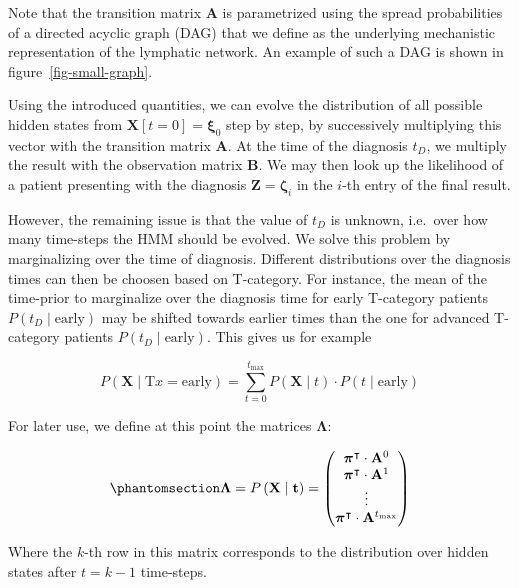 \documentclass[
  sn-mathphys-num,
]{sn-jnl}
\begin{document}
Note that the transition matrix \(\mathbf{A}\) is parametrized using the
spread probabilities of a directed acyclic graph (DAG) that we define as
the underlying mechanistic representation of the lymphatic network. An
example of such a DAG is shown in figure~\ref{fig-small-graph}.

Using the introduced quantities, we can evolve the distribution of all
possible hidden states from \(\mathbf{X}[t=0] = \boldsymbol{\xi}_0\)
step by step, by successively multiplying this vector with the
transition matrix \(\mathbf{A}\). At the time of the diagnosis \(t_D\),
we multiply the result with the observation matrix \(\mathbf{B}\). We
may then look up the likelihood of a patient presenting with the
diagnosis \(\mathbf{Z}=\boldsymbol{\zeta}_i\) in the \(i\)-th entry of
the final result.

However, the remaining issue is that the value of \(t_D\) is unknown,
i.e.~over how many time-steps the HMM should be evolved. We solve this
problem by marginalizing over the time of diagnosis. Different
distributions over the diagnosis times can then be choosen based on
T-category. For instance, the mean of the time-prior to marginalize over
the diagnosis time for early T-category patients
\(P\left( t_D \mid \text{early} \right)\) may be shifted towards earlier
times than the one for advanced T-category patients
\(P\left( t_D \mid \text{early} \right)\). This gives us for example

\[
P\left( \mathbf{X} \mid \text{T}x = \text{early} \right) = \sum_{t=0}^{t_\text{max}} P \left( \mathbf{X} \mid t \right) \cdot P(t \mid \text{early})
\]

For later use, we define at this point the matrices
\(\boldsymbol{\Lambda}\):

\begin{equation}\phantomsection\label{eq-lambda-matrix}{
\boldsymbol{\Lambda} = P \left( \mathbf{X} \mid \mathbf{t} \right) = \begin{pmatrix}
\boldsymbol{\pi}^\intercal \cdot \mathbf{A}^0 \\
\boldsymbol{\pi}^\intercal \cdot \mathbf{A}^1 \\
\vdots \\
\boldsymbol{\pi}^\intercal \cdot \mathbf{A}^{t_\text{max}} \\
\end{pmatrix}
}\end{equation}

Where the \(k\)-th row in this matrix corresponds to the distribution
over hidden states after \(t=k-1\) time-steps.
\end{document}
